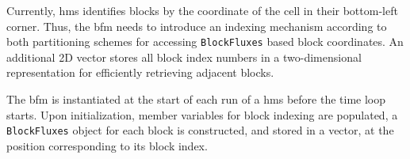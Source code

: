 Currently, \gls{hms} identifies blocks by the coordinate of the cell in their bottom-left corner.
Thus, the \acrlong{bfm} needs to introduce an indexing mechanism according to both partitioning schemes for accessing \texttt{BlockFluxes} based block coordinates.
An additional \gls{2D} vector stores all block index numbers in a two-dimensional representation for efficiently retrieving adjacent blocks. 

The \gls{bfm} is instantiated at the start of each run of a \gls{hms} before the time loop starts.
Upon initialization, member variables for block indexing are populated, a \texttt{BlockFluxes} object for each block is constructed, and stored in a vector, at the position corresponding to its block index.
